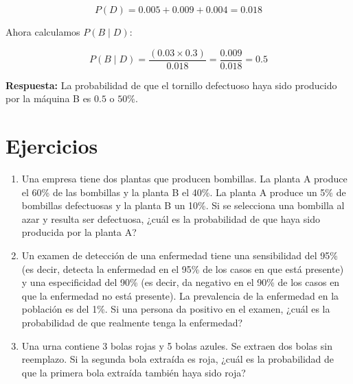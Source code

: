 \documentclass[letterpaper, 12pt]{article}
\begin{document}
	\[
	P(D) = 0.005 + 0.009 + 0.004 = 0.018
	\]
	
	Ahora calculamos \( P(B \mid D) \):
	
	\[
	P(B \mid D) = \frac{(0.03 \times 0.3)}{0.018} = \frac{0.009}{0.018} = 0.5
	\]
	
	\textbf{Respuesta:} La probabilidad de que el tornillo defectuoso haya sido producido por la máquina B es \( 0.5 \) o \( 50\% \).
	
	\section{Ejercicios}
	
	\begin{enumerate}
		\item Una empresa tiene dos plantas que producen bombillas. La planta A produce el 60\% de las bombillas y la planta B el 40\%. La planta A produce un 5\% de bombillas defectuosas y la planta B un 10\%. Si se selecciona una bombilla al azar y resulta ser defectuosa, ¿cuál es la probabilidad de que haya sido producida por la planta A?
		\item Un examen de detección de una enfermedad tiene una sensibilidad del 95\% (es decir, detecta la enfermedad en el 95\% de los casos en que está presente) y una especificidad del 90\% (es decir, da negativo en el 90\% de los casos en que la enfermedad no está presente). La prevalencia de la enfermedad en la población es del 1\%. Si una persona da positivo en el examen, ¿cuál es la probabilidad de que realmente tenga la enfermedad?
		\item Una urna contiene 3 bolas rojas y 5 bolas azules. Se extraen dos bolas sin reemplazo. Si la segunda bola extraída es roja, ¿cuál es la probabilidad de que la primera bola extraída también haya sido roja?
	\end{enumerate}
	
	\newpage
\end{document}
